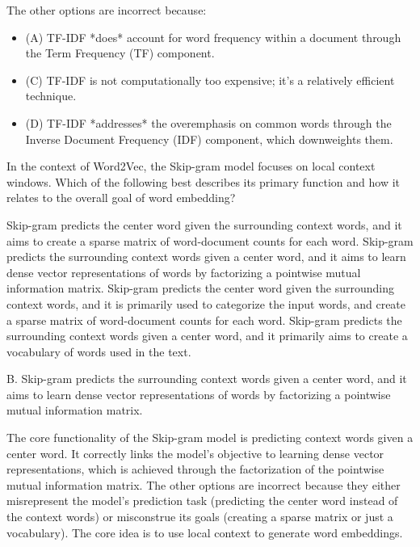\documentclass[11pt,addpoints,answers]{exam}
\begin{document}
\begin{questions}
\begin{solution}
The other options are incorrect because:
\begin{itemize}
  \item (A) TF-IDF *does* account for word frequency within a document through the Term Frequency (TF) component.
  \item (C) TF-IDF is not computationally too expensive; it's a relatively efficient technique.
  \item (D) TF-IDF *addresses* the overemphasis on common words through the Inverse Document Frequency (IDF) component, which downweights them.
\end{itemize}
\end{solution}

\question[1] In the context of Word2Vec, the Skip-gram model focuses on local context windows. Which of the following best describes its primary function and how it relates to the overall goal of word embedding?
  \begin{choices}
    \choice Skip-gram predicts the center word given the surrounding context words, and it aims to create a sparse matrix of word-document counts for each word.
    \choice Skip-gram predicts the surrounding context words given a center word, and it aims to learn dense vector representations of words by factorizing a pointwise mutual information matrix.
    \choice Skip-gram predicts the center word given the surrounding context words, and it is primarily used to categorize the input words, and create a sparse matrix of word-document counts for each word.
    \choice Skip-gram predicts the surrounding context words given a center word, and it primarily aims to create a vocabulary of words used in the text.
  \end{choices}
\begin{solution}
  B. Skip-gram predicts the surrounding context words given a center word, and it aims to learn dense vector representations of words by factorizing a pointwise mutual information matrix.

  The core functionality of the Skip-gram model is predicting context words given a center word. It correctly links the model's objective to learning dense vector representations, which is achieved through the factorization of the pointwise mutual information matrix. The other options are incorrect because they either misrepresent the model's prediction task (predicting the center word instead of the context words) or misconstrue its goals (creating a sparse matrix or just a vocabulary). The core idea is to use local context to generate word embeddings.
\end{solution}


\end{questions}
\end{document}
